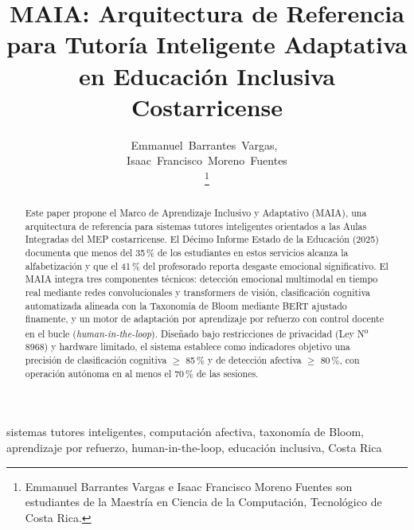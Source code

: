 \documentclass[journal]{IEEEtran}
\title{MAIA: Arquitectura de Referencia para Tutor\'ia Inteligente Adaptativa en Educaci\'on Inclusiva Costarricense}
\author{
    Emmanuel~Barrantes~Vargas,~\\
    Isaac~Francisco~Moreno~Fuentes\\
    \thanks{Emmanuel Barrantes Vargas e Isaac Francisco Moreno Fuentes son estudiantes de la Maestr\'ia en Ciencia de la Computaci\'on, Tecnol\'ogico de Costa Rica.}
}
\begin{document}
\maketitle

\begin{abstract}
Este paper propone el Marco de Aprendizaje Inclusivo y Adaptativo (MAIA),
una arquitectura de referencia para sistemas tutores inteligentes orientados
a las Aulas Integradas del MEP costarricense. El D\'ecimo Informe Estado de
la Educaci\'on (2025) documenta que menos del 35\,\% de los estudiantes en
estos servicios alcanza la alfabetizaci\'on y que el 41\,\% del profesorado
reporta desgaste emocional significativo. El MAIA integra tres componentes
t\'ecnicos: detecci\'on emocional multimodal en tiempo real mediante redes
convolucionales y transformers de visi\'on, clasificaci\'on cognitiva
automatizada alineada con la Taxonom\'ia de Bloom mediante BERT ajustado
finamente, y un motor de adaptaci\'on por aprendizaje por refuerzo con
control docente en el bucle (\textit{human-in-the-loop}). Dise\~nado bajo
restricciones de privacidad (Ley N\textsuperscript{o}\,8968) y hardware
limitado, el sistema establece como indicadores objetivo una precisi\'on de
clasificaci\'on cognitiva $\geq$ 85\,\% y de detecci\'on afectiva
$\geq$ 80\,\%, con operaci\'on aut\'onoma en al menos el 70\,\% de las
sesiones.
\end{abstract}

\begin{IEEEkeywords}
sistemas tutores inteligentes, computaci\'on afectiva, taxonom\'ia de Bloom, aprendizaje por refuerzo, human-in-the-loop, educaci\'on inclusiva, Costa Rica
\end{IEEEkeywords}









\end{document}
